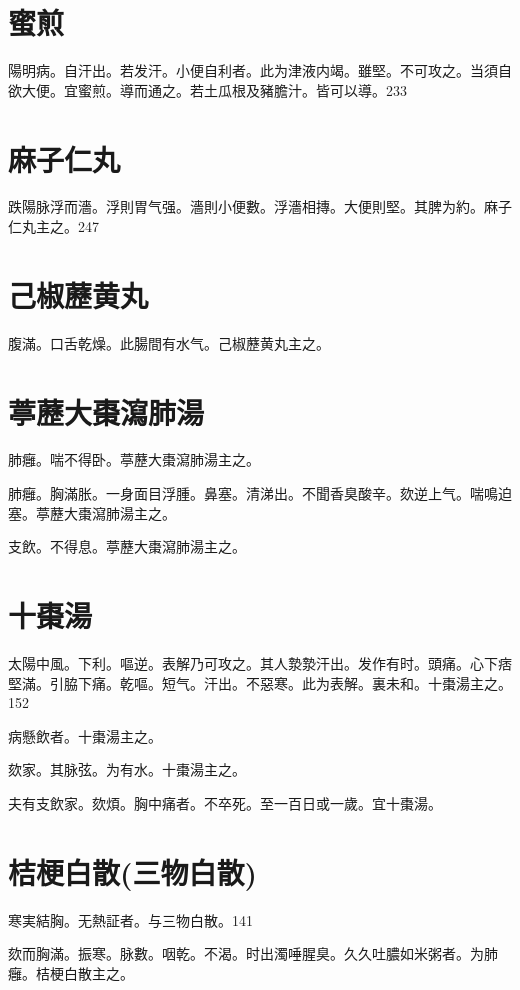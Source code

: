 \documentclass[b5paper,twoside,zihao=-4,UTF8]{ctexbook}
\begin{document}
\section{蜜煎}

陽明病。自汗出。若发汗。小便自利者。此为{津液}内竭。雖堅。不可攻之。当須自欲大便。宜蜜煎。導而通之。若土瓜根及豬膽汁。皆可以導。233

\section{麻子仁丸}

跌陽脉浮而濇。浮則胃气强。濇則小便數。浮濇相摶。大便則堅。其脾为約。麻子仁丸主之。247

\section{己椒藶黄丸}

腹滿。口舌乾燥。此腸間有水气。己椒藶黄丸主之。

\section{葶藶大棗瀉肺湯}

肺癰。喘不得卧。葶藶大棗瀉肺湯主之。

肺癰。胸滿胀。一身面目浮腫。鼻塞。清涕出。不聞香臭酸辛。欬逆上气。喘鳴迫塞。葶藶大棗瀉肺湯主之。

支飲。不得息。葶藶大棗瀉肺湯主之。

\section{十棗湯}

太陽中風。下利。嘔逆。表解乃可攻之。其人漐漐汗出。发作有时。頭痛。心下痞堅滿。引脇下痛。乾嘔。短气。汗出。不惡寒。此为表解。裏未和。十棗湯主之。152

病懸飲者。十棗湯主之。

欬家。其脉弦。为有水。十棗湯主之。

夫有支飲家。欬煩。胸中痛者。不卒死。至一百日{或}一歲。宜十棗湯。

\section{桔梗白散(三物白散)}

寒実結胸。无熱証者。与三物白散。141

欬而胸滿。振寒。脉數。咽乾。不渴。时出濁唾腥臭。久久吐膿如米粥者。为肺癰。桔梗白散主之。
\end{document}
